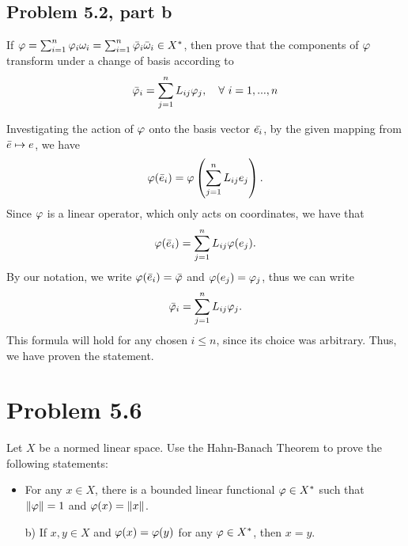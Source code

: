 \newpage
\subsection{Problem 5.2, part b}
If $\varphi = \sum_{i = 1}^n \varphi_i \omega_i = \sum_{i = 1}^n \Bar{\varphi}_i \Bar{\omega}_i \in X^{*}$, then prove that the components of $\varphi$ transform under a change of basis according to
\[\Bar{\varphi}_i = \sum_{j  =1}^n L_{ij}\varphi_j, \quad \forall \ i = 1, ..., n\]
\partbreak
\begin{solution}

    Investigating the action of $\varphi$ onto the basis vector $\Bar{e_i}$, by the given mapping from $\Bar{e} \mapsto e$, we have 
    \[\varphi(\Bar{e}_i) = \varphi \left( \sum_{j = 1}^n L_{ij} e_j\right).\]
    Since $\varphi$ is a linear operator, which only acts on coordinates, we have that 
    \[\varphi(\Bar{e}_i) = \sum_{j = 1}^n L_{ij} \varphi (e_j).\]
    By our notation, we write $\varphi(\Bar{e}_i) = \Bar{\varphi}$ and $\varphi (e_j) = \varphi_j$, thus we can write
    \[\Bar{\varphi}_i = \sum_{j = 1}^n L_{ij} \varphi_j.\]
    This formula will hold for any chosen $i \leq n$, since its choice was arbitrary. Thus, we have proven the statement. 
\end{solution}

\newpage
\section{Problem 5.6}
Let $X$ be a normed linear space. Use the Hahn-Banach Theorem to prove the following statements:
\begin{itemize}[a)]
    \item For any $x \in X$, there is a bounded linear functional $\varphi \in X^{*}$ such that $\norm{\varphi} = 1$ and $\varphi (x) = \norm{x}$.
    \item[b)] If $x, y \in X$ and $\varphi(x) = \varphi(y) $ for any $\varphi \in X^{*}$, then $x = y$.
\end{itemize}
